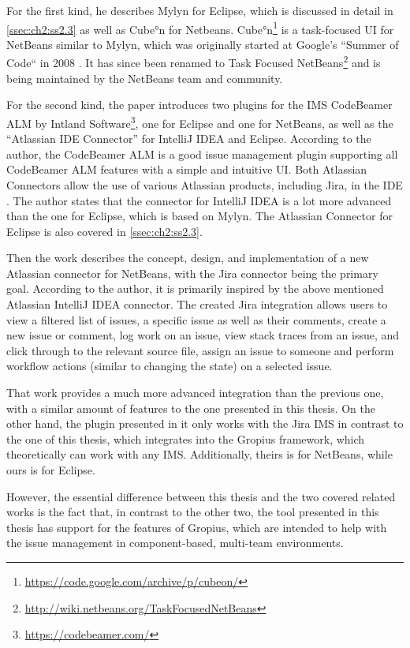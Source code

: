 For the first kind, he describes Mylyn for \gls{Eclipse}, which is discussed in detail in \cref{ssec:ch2:ss2.3} as well as Cube°n for Netbeans.
Cube°n\footnote{\url{https://code.google.com/archive/p/cubeon/}} is a task-focused \gls{UI} for NetBeans similar to Mylyn, which was originally started at Google's ``Summer of Code`` in 2008 \cite{janak2009issue}.
It has since been renamed to Task Focused NetBeans\footnote{\url{http://wiki.netbeans.org/TaskFocusedNetBeans}} and is being maintained by the NetBeans team and community.

For the second kind, the paper introduces two plugins for the \gls{IMS} CodeBeamer ALM by Intland Software\footnote{\url{https://codebeamer.com/}}, one for \gls{Eclipse} and one for NetBeans, as well as the ``Atlassian IDE Connector'' for IntelliJ IDEA and \gls{Eclipse}.
According to the author, the CodeBeamer ALM is a good issue management plugin supporting all CodeBeamer ALM features with a simple and intuitive \gls{UI}.
Both Atlassian Connectors allow the use of various Atlassian products, including Jira, in the \gls{IDE} \cite{janak2009issue}.
The author states that the connector for IntelliJ IDEA is a lot more advanced than the one for \gls{Eclipse}, which is based on Mylyn.
The Atlassian Connector for \gls{Eclipse} is also covered in \cref{ssec:ch2:ss2.3}.

Then the work describes the concept, design, and implementation of a new Atlassian connector for NetBeans, with the Jira connector being the primary goal.
According to the author, it is primarily inspired by the above mentioned Atlassian IntelliJ IDEA connector.
The created Jira integration allows users to view a filtered list of issues, a specific issue as well as their comments, create a new issue or comment, log work on an issue, view stack traces from an issue, and click through to the relevant source file, assign an issue to someone and perform workflow actions (similar to changing the state) on a selected issue.

That work provides a much more advanced integration than the previous one, with a similar amount of features to the one presented in this thesis.
On the other hand, the plugin presented in it only works with the Jira \gls{IMS} in contrast to the one of this thesis, which integrates into the \gls{Gropius} framework, which theoretically can work with any \gls{IMS}.
Additionally, theirs is for NetBeans, while ours is for \gls{Eclipse}.

However, the essential difference between this thesis and the two covered related works
is the fact that, in contrast to the other two, the tool presented in this thesis has support for the features of \gls{Gropius},
which are intended to help with the issue management in component-based, multi-team environments.



